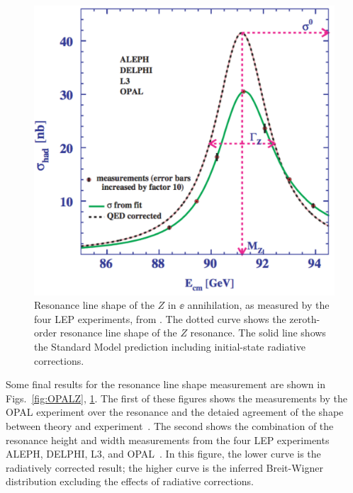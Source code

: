 \documentclass[12pt]{article}
\begin{document}
\begin{figure}
\begin{center}
\includegraphics[width=0.50\hsize]{LEPZ.pdf}
\end{center}
\caption{Resonance line shape of the $Z$ in $\ee$ annihilation, as
  measured by the four LEP experiments, from \cite{LEPEWWG}.  The
  dotted curve shows the zeroth-order resonance line shape of the $Z$
  resonance.  The solid line shows the Standard Model prediction
  including initial-state radiative corrections.}
\label{fig:LEPZ}
\end{figure}



Some final results for the resonance line shape measurement are shown
in Figs.~\ref{fig:OPALZ}, \ref{fig:LEPZ}.   The first of these figures
shows the measurements by the OPAL experiment over the resonance and
the detaied agreement of the shape between theory and experiment~\cite{OPALZ}.
The second shows the combination of the resonance height and width
measurements from the four LEP experiments ALEPH, DELPHI, L3, and
OPAL~\cite{LEPEWWG}.   In this figure, the lower curve is the
radiatively corrected result; the higher curve is the inferred
Breit-Wigner distribution excluding the effects of radiative corrections.
\end{document}
